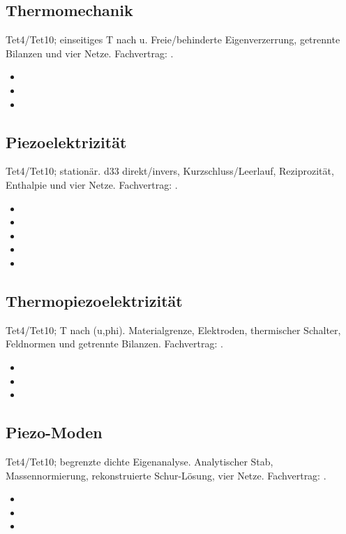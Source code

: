 \subsection{Thermomechanik}
\label{sec:vv-thermomechanics}
Tet4/Tet10; einseitiges T nach u. Freie/behinderte Eigenverzerrung, getrennte Bilanzen und vier Netze.
Fachvertrag: .
\begin{itemize}
\item {}
\item {}
\item {}
\end{itemize}
\subsection{Piezoelektrizität}
\label{sec:vv-piezoelectric}
Tet4/Tet10; stationär. d33 direkt/invers, Kurzschluss/Leerlauf, Reziprozität, Enthalpie und vier Netze.
Fachvertrag: .
\begin{itemize}
\item {}
\item {}
\item {}
\item {}
\item {}
\end{itemize}
\subsection{Thermopiezoelektrizität}
\label{sec:vv-thermopiezoelectric}
Tet4/Tet10; T nach (u,phi). Materialgrenze, Elektroden, thermischer Schalter, Feldnormen und getrennte Bilanzen.
Fachvertrag: .
\begin{itemize}
\item {}
\item {}
\item {}
\end{itemize}
\subsection{Piezo-Moden}
\label{sec:vv-modal}
Tet4/Tet10; begrenzte dichte Eigenanalyse. Analytischer Stab, Massennormierung, rekonstruierte Schur-Lösung, vier Netze.
Fachvertrag: .
\begin{itemize}
\item {}
\item {}
\item {}
\end{itemize}
